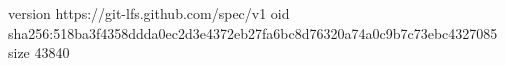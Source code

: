 version https://git-lfs.github.com/spec/v1
oid sha256:518ba3f4358ddda0ec2d3e4372eb27fa6bc8d76320a74a0c9b7c73ebc4327085
size 43840
